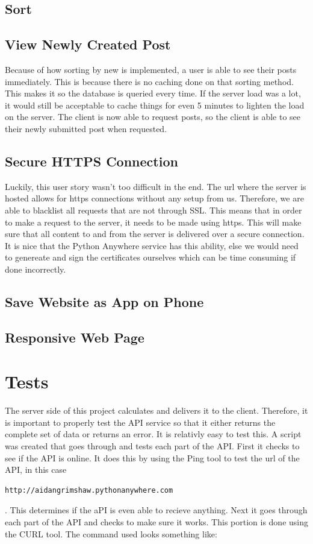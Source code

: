 \documentclass[12pt]{article}
\begin{document}
\subsection{Sort}

\subsection{View Newly Created Post}
Because of how sorting by new is implemented, a user is able to see their posts immediately.  
This is because there is no caching done on that sorting method.  This makes it so the 
database is queried every time.  If the server load was a lot, it would still be acceptable 
to cache things for even 5 minutes to lighten the load on the server.  The client is now 
able to request posts, so the client is able to see their newly submitted post when requested.

\subsection{Secure HTTPS Connection}

Luckily, this user story wasn't too difficult in the end.  The url where the server is hosted 
allows for https connections without any setup from us.  Therefore, we are able to blacklist 
all requests that are not through SSL.  This means that in order to make a request to the 
server, it needs to be made using https.  This will make sure that all content to and from the 
server is delivered over a secure connection.  It is nice that the Python Anywhere service has 
this ability, else we would need to genereate and sign the certificates ourselves which can be 
time consuming if done incorrectly.

\subsection{Save Website as App on Phone}

\subsection{Responsive Web Page}

\section{Tests}

The server side of this project calculates and delivers it to the client.
Therefore, it is important to properly test the API service so that it either
returns the complete set of data or returns an error.  It is relativly easy to
test this.  A script was created that goes through and tests each part of the
API.  First it checks to see if the API is online.  It does this by using the
Ping tool to test the url of the API, in this case
\begin{verbatim}http://aidangrimshaw.pythonanywhere.com \end{verbatim}.  This
determines if the aPI is even able to recieve anything.  Next it goes through
each part of the API and checks to make sure it works.  This portion is done
using the CURL tool.  The command used looks something like:
\end{document}
